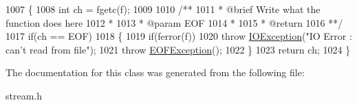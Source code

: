 \begin{DoxyCode}
1007         \{
1008             \textcolor{keywordtype}{int} ch = fgetc(f);
1009 \textcolor{comment}{}
1010 \textcolor{comment}{            /**}
1011 \textcolor{comment}{             * @brief Write what the function does here}
1012 \textcolor{comment}{             *}
1013 \textcolor{comment}{             * @param EOF}
1014 \textcolor{comment}{             *}
1015 \textcolor{comment}{             * @return}
1016 \textcolor{comment}{             **/}
1017             \textcolor{keywordflow}{if}(ch == EOF)
1018             \{
1019                 \textcolor{keywordflow}{if}(ferror(f))
1020                     \textcolor{keywordflow}{throw} \hyperlink{classIOException}{IOException}(\textcolor{stringliteral}{"IO Error : can't read from file"});
1021                 \textcolor{keywordflow}{throw} \hyperlink{classEOFException}{EOFException}();
1022             \}
1023             \textcolor{keywordflow}{return} ch;
1024         \}
\end{DoxyCode}


The documentation for this class was generated from the following file\+:\begin{DoxyCompactItemize}
\item 
stream.\+h\end{DoxyCompactItemize}
